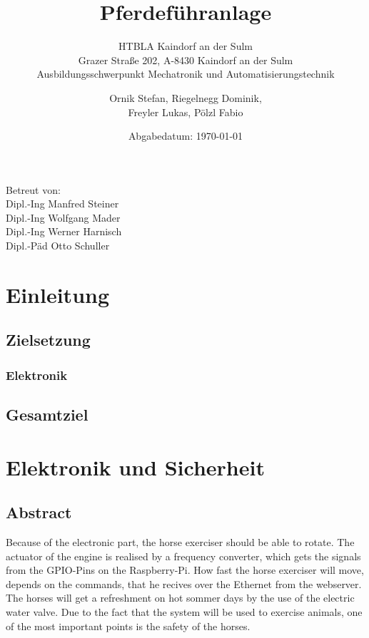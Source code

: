 \documentclass[12pt]{scrreprt} %
\title{Pferdeführanlage \\ }
\subtitle{HTBLA Kaindorf an der Sulm \\ Grazer Straße 202, A-8430 Kaindorf an der Sulm \\ Ausbildungsschwerpunkt Mechatronik und Automatisierungstechnik}
\author{Ornik Stefan, Riegelnegg Dominik, \\ Freyler Lukas, Pölzl Fabio}
\date{Abgabedatum: \today{}}
\begin{document}
\maketitle

\begin{center} 
Betreut von:\\Dipl.-Ing Manfred Steiner\\Dipl.-Ing Wolfgang Mader\\Dipl.-Ing Werner Harnisch\\Dipl.-Päd Otto Schuller
\end{center}


\tableofcontents

\listoffigures

\listoftables

\newpage
\chapter{Einleitung}
\label{sec:einleitung}

\section{Zielsetzung}
\label{sec:zielsetzung}

\subsection{Elektronik}
\label{sec:elektronik}

\section{Gesamtziel}
\label{sec:gesamtziel}

\chapter{Elektronik und Sicherheit}
\label{sec:elektronikUndSicherheit}

\section{Abstract}
\label{sec:abstract}

Because of the electronic part, the horse exerciser should be able to rotate. 
The actuator of the engine is realised by a frequency converter, which gets the signals from the GPIO-Pins on the Raspberry-Pi.
How fast the horse exerciser will move, depends on the commands, that he recives over the Ethernet from the webserver.
The horses will get a refreshment on hot sommer days by the use of the electric water valve.
Due to the fact that the system will be used to exercise animals, one of the most important points is the safety of the horses.
\end{document}
